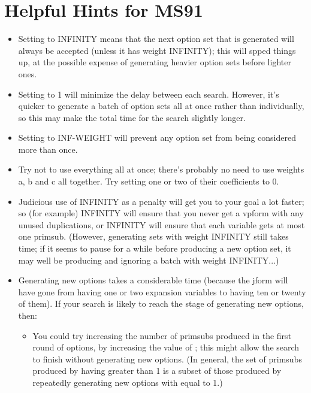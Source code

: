 \section{Helpful Hints for MS91}
\begin{itemize}
\item Setting  to INFINITY means that the next option
set that is generated will always be accepted (unless it has weight INFINITY); this
will spped things up, at the possible expense of generating heavier option sets
before lighter ones.

\item Setting  to 1 will minimize the delay between each search.
However, it's quicker to generate a batch of option sets all at once rather than individually,
so this may make the total time for the search slightly longer.

\item Setting  to INF-WEIGHT will prevent any option set from being
considered more than once.

\item Try not to use everything all at once; there's probably no need to use
weights a, b and c all together. Try setting one or two of their coefficients to 0.

\item Judicious use of INFINITY as a penalty will get you to your goal a lot
faster; so (for example)  INFINITY will ensure
that you never get a vpform with any unused duplications, or
 INFINITY will ensure that each variable gets
at most one primsub. (However, generating sets with weight INFINITY still
takes time; if it seems to pause for a while before producing a new option
set, it may well be producing and ignoring a batch with weight INFINITY...)

\item Generating new options takes a considerable time (because the jform will have gone from
having one or two expansion variables to having ten or twenty of them).
If your search is likely to reach
the stage of generating new options, then:
\begin{itemize}
\item You could try increasing the number of primsubs produced in the first round of options,
by increasing the value of ; this might allow the search to
finish without generating new options. (In general, the set of primsubs produced by having
 greater than 1 is a subset of those produced by repeatedly
generating new options with  equal to 1.)


\end{itemize}
\end{itemize}

